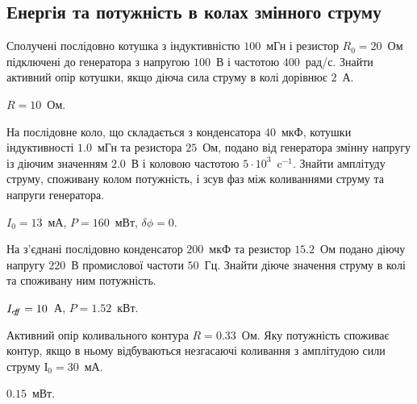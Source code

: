 \subsection*{Енергія та потужність в колах змінного струму}

\begin{problem}%
Сполучені послідовно котушка з індуктивністю $100$~мГн і резистор
$R_0 = 20$~Ом підключені до генератора з напругою $100$~В і частотою $400$~рад/с. Знайти активний опір котушки, якщо діюча сила струму в колі дорівнює $2$~А.
\begin{solution}
	$R = 10$~Ом.
\end{solution}
\end{problem}

\begin{problem}%
На послідовне коло, що складається з конденсатора $40$~мкФ, котушки
індуктивності $1.0$~мГн та резистора $25$~Ом, подано від генератора змінну напругу із діючим значенням $2.0$~В і коловою частотою $5\cdot 10^3$~c${}^{-1}$. Знайти амплітуду струму, споживану колом потужність, і зсув фаз між коливаннями струму та     напруги генератора.
\begin{solution}
	$I_0 = 13$~мА, $P = 160$~мВт, $\delta\phi = 0$.
\end{solution}
\end{problem}

\begin{problem}%
На з'єднані послідовно конденсатор $200$~мкФ та резистор $15.2$~Ом подано діючу напругу $220$~В промислової частоти $50$~Гц. Знайти діюче значення
струму в колі та споживану ним потужність.
\begin{solution}
	$I_{e\kern-2.2pt f\kern-3pt f} = 10$~А, $P = 1.52$~кВт.
\end{solution}
\end{problem}

\begin{problem}%
Активний опір коливального контура $R = 0.33$~Ом. Яку потужність
споживає контур, якщо в ньому відбуваються незгасаючі коливання з амплітудою сили струму $І_0 = 30$~мА.
\begin{solution}
	$0.15$~мВт.
\end{solution}
\end{problem}


